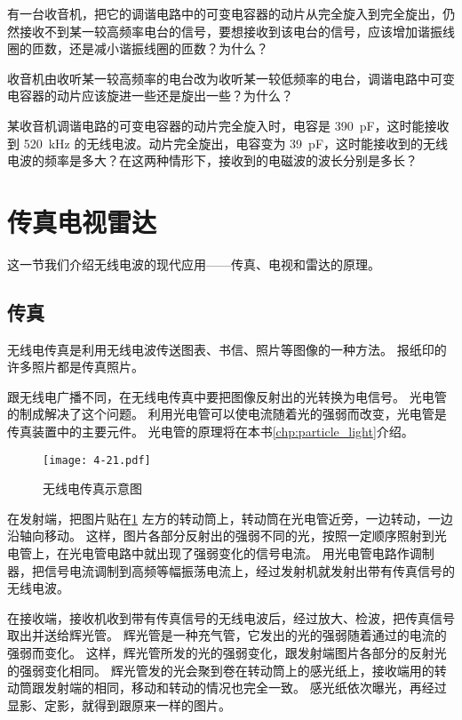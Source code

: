 \begin{Practice}
\begin{question}
	\item 有一台收音机，把它的调谐电路中的可变电容器的动片从完全旋入到完全旋出，仍然接收不到某一较高频率电台的信号，要想接收到该电台的信号，应该增加谐振线圈的匝数，还是减小谐振线圈的匝数？为什么？
	\item 收音机由收听某一较高频率的电台改为收听某一较低频率的电台，调谐电路中可变电容器的动片应该旋进一些还是旋出一些？为什么？
	\item 某收音机调谐电路的可变电容器的动片完全旋入时，电容是 \qty{390}{\pico F}，这时能接收到 \qty{520}{kHz} 的无线电波。动片完全旋出，电容变为 \qty{39}{\pico F}，这时能接收到的无线电波的频率是多大？在这两种情形下，接收到的电磁波的波长分别是多长？
\end{question}
\end{Practice}

\section{传真\texorpdfstring{\quad}{ }电视\texorpdfstring{\quad}{ }雷达}
这一节我们介绍无线电波的现代应用——传真、电视和雷达的原理。

\subsection{传真}

无线电传真是利用无线电波传送图表、书信、照片等图像的一种方法。
报纸印的许多照片都是传真照片。

跟无线电广播不同，在无线电传真中要把图像反射出的光转换为电信号。
光电管的制成解决了这个问题。
利用光电管可以使电流随着光的强弱而改变，光电管是传真装置中的主要元件。
光电管的原理将在本书\cref{chp:particle_light}介绍。
\begin{figure}
	\texttt{[image: 4-21.pdf]}
	\caption{无线电传真示意图}\label{fig:4-21}
\end{figure}

在发射端，把图片贴在\cref{fig:4-21} 左方的转动筒上，转动筒在光电管近旁，一边转动，一边沿轴向移动。
这样，图片各部分反射出的强弱不同的光，按照一定顺序照射到光电管上，在光电管电路中就出现了强弱变化的信号电流。
用光电管电路作调制器，把信号电流调制到高频等幅振荡电流上，经过发射机就发射出带有传真信号的无线电波。

在接收端，接收机收到带有传真信号的无线电波后，经过放大、检波，把传真信号取出并送给辉光管。
辉光管是一种充气管，它发出的光的强弱随着通过的电流的强弱而变化。
这样，辉光管所发的光的强弱变化，跟发射端图片各部分的反射光的强弱变化相同。
辉光管发的光会聚到卷在转动筒上的感光纸上，接收端用的转动筒跟发射端的相同，移动和转动的情况也完全一致。
感光纸依次曝光，再经过显影、定影，就得到跟原来一样的图片。

